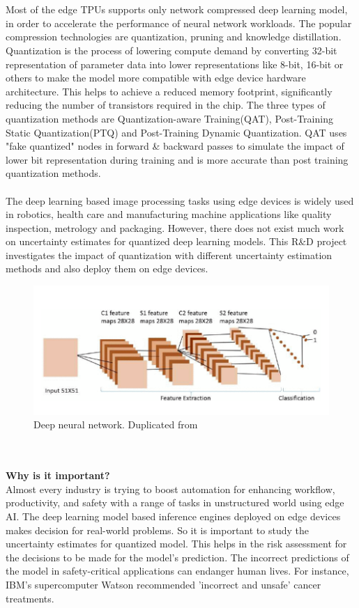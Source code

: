 \documentclass[rnd]{mas_proposal}
\begin{document}
\\\\
Most of the edge TPUs supports only network compressed deep learning model, in order to accelerate the performance of neural network workloads. The popular compression technologies are quantization, pruning and knowledge distillation. Quantization is the process of lowering compute demand by converting 32-bit representation of parameter data into lower representations like 8-bit, 16-bit or others to make the model more compatible with edge device hardware architecture. This helps to achieve a reduced memory footprint, significantly reducing the number of transistors required in the chip. The three types of quantization methods are Quantization-aware Training(QAT), Post-Training Static Quantization(PTQ) and Post-Training Dynamic Quantization\cite{qunatifi}. QAT uses "fake quantized" nodes in forward \& backward passes to simulate the impact of lower bit representation during training and is more accurate than post training quantization methods.
\\\\
The deep learning based image processing tasks using edge devices is widely used in robotics, health care and manufacturing machine applications like quality inspection\cite{syberfeldt2020image}, metrology and packaging. However, there does not exist much work on uncertainty estimates for quantized deep learning models. This R\&D project investigates the impact of quantization with different uncertainty estimation methods and also deploy them on  edge devices.
\begin{figure}[h!]
    \includegraphics[width=\textwidth]{images/DNN.png}
    \caption{Deep neural network. Duplicated from \cite{DNN_Picture}}
    \label{fig:myfigure}
\end{figure}
\\\\
\textbf{Why is it important?} \\
Almost every industry is trying to boost automation for enhancing workflow, productivity, and safety with a range of tasks in unstructured world using edge AI. The deep learning model based inference engines deployed on edge devices makes decision for real-world problems. So it is important to study the uncertainty estimates for quantized model. This helps in the risk assessment for the decisions to be made for the model's prediction. The incorrect predictions of the model in safety-critical applications can endanger human lives. For instance, IBM's supercomputer Watson recommended 'incorrect and unsafe' cancer treatments\cite{ibm}. 
\end{document}
